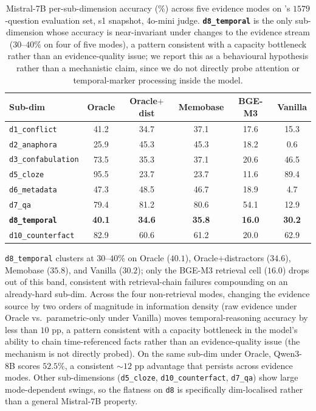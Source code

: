 \begin{table}[h]
\centering
\small
\caption{Mistral-7B per-sub-dimension accuracy (\%) across five evidence modes on \benchL's $1579$-question evaluation set, s1 snapshot, 4o-mini judge. \textbf{\texttt{d8\_temporal}} is the only sub-dimension whose accuracy is near-invariant under changes to the evidence stream ($30$--$40\%$ on four of five modes), a pattern consistent with a capacity bottleneck rather than an evidence-quality issue; we report this as a behavioural hypothesis rather than a mechanistic claim, since we do not directly probe attention or temporal-marker processing inside the model.}
\label{tab:mistral-crossmode}
\begin{tabular}{lccccc}
\toprule
Sub-dim & Oracle & Oracle$+$dist & Memobase & BGE-M3 & Vanilla \\
\midrule
\texttt{d1\_conflict}      & 41.2 & 34.7 & 37.1 & 17.6 & 15.3 \\
\texttt{d2\_anaphora}      & 25.9 & 45.3 & 45.3 & 18.2 & \phantom{0}0.6 \\
\texttt{d3\_confabulation} & 73.5 & 35.3 & 37.1 & 20.6 & 46.5 \\
\texttt{d5\_cloze}         & 95.5 & 23.7 & 23.7 & 11.6 & 89.4 \\
\texttt{d6\_metadata}      & 47.3 & 48.5 & 46.7 & 18.9 & \phantom{0}4.7 \\
\texttt{d7\_qa}            & 79.4 & 81.2 & 80.6 & 54.1 & 12.9 \\
\textbf{\texttt{d8\_temporal}} & \textbf{40.1} & \textbf{34.6} & \textbf{35.8} & \textbf{16.0} & \textbf{30.2} \\
\texttt{d10\_counterfact}  & 82.9 & 60.6 & 61.2 & 20.0 & 62.9 \\
\bottomrule
\end{tabular}
\end{table}

\texttt{d8\_temporal} clusters at $30$--$40\%$ on Oracle ($40.1$), Oracle$+$distractors ($34.6$), Memobase ($35.8$), and Vanilla ($30.2$); only the BGE-M3 retrieval cell ($16.0$) drops out of this band, consistent with retrieval-chain failures compounding on an already-hard sub-dim. Across the four non-retrieval modes, changing the evidence source by two orders of magnitude in information density (raw evidence under Oracle vs.\ parametric-only under Vanilla) moves temporal-reasoning accuracy by less than $10$ pp, a pattern consistent with a capacity bottleneck in the model's ability to chain time-referenced facts rather than an evidence-quality issue (the mechanism is not directly probed). On the same sub-dim under Oracle, Qwen3-8B scores $52.5\%$, a consistent $\sim\!12$ pp advantage that persists across evidence modes. Other sub-dimensions (\texttt{d5\_cloze}, \texttt{d10\_counterfact}, \texttt{d7\_qa}) show large mode-dependent swings, so the flatness on \texttt{d8} is specifically dim-localised rather than a general Mistral-7B property.


